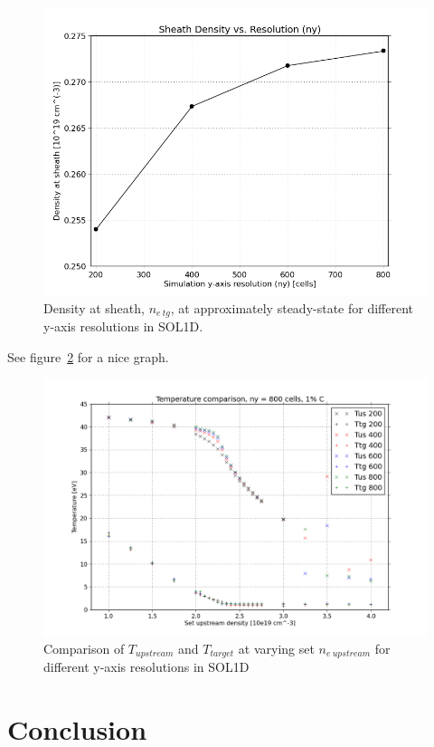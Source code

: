 \documentclass[11pt, twocolumn]{article}  %
\providecommand{\netg}{$n_{e~tg}$} %
\begin{document}
\begin{figure}
\includegraphics[scale=0.4]{Figures/sol1d/RichExtrp_neres.PNG}
\centering
\caption{Density at sheath, \netg, at approximately steady-state for different y-axis resolutions in SOL1D.}\label{fig:RichExtrp_neres}
\end{figure}



See figure~\ref{fig:TT_IMPCOMBO} for a nice graph.

\begin{figure}
\includegraphics[scale=0.4]{Figures/sol1d/TT_IMPCOMBO.PNG}
\centering
\caption{Comparison of $T_{upstream}$ and $T_{target}$ at varying set $n_{e~upstream}$ for different y-axis resolutions in SOL1D}\label{fig:TT_IMPCOMBO}
\end{figure}

\section{Conclusion}\label{sec:Conclusion}




\printbibliography
\end{document}
